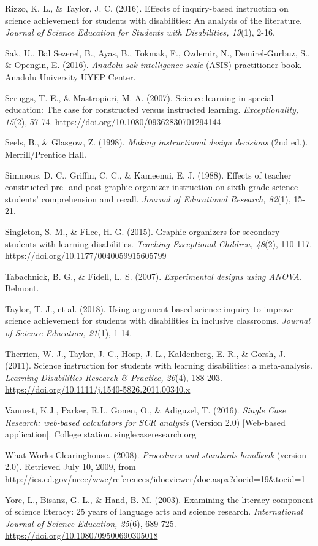 \documentclass[11.5pt]{sig-alternate} %
\begin{document}
Rizzo, K. L., \& Taylor, J. C. (2016). Effects of inquiry-based instruction on science achievement for students with disabilities: An analysis of the literature. \textit{Journal of Science Education for Students with Disabilities, 19}(1), 2-16.

Sak, U., Bal Sezerel, B., Ayas, B., Tokmak, F., Ozdemir, N., Demirel-Gurbuz, S., \& Opengin, E. (2016). \textit{Anadolu-sak intelligence scale} (ASIS) practitioner book. Anadolu University UYEP Center. 

Scruggs, T. E., \& Mastropieri, M. A. (2007). Science learning in special education: The case for constructed versus instructed learning. \textit{Exceptionality, 15}(2), 57-74. \url{https://doi.org/10.1080/09362830701294144}

Seels, B., \& Glasgow, Z. (1998). \textit{Making instructional design decisions} (2nd ed.). Merrill/Prentice Hall. 

Simmons, D. C., Griffin, C. C., \& Kameenui, E. J. (1988). Effects of teacher constructed pre- and post-graphic organizer instruction on sixth-grade science students' comprehension and recall. \textit{Journal of Educational Research, 82}(1), 15-21.

Singleton, S. M., \& Filce, H. G. (2015). Graphic organizers for secondary students with learning disabilities. \textit{Teaching Exceptional Children, 48}(2), 110-117. \url{https://doi.org/10.1177/0040059915605799}

Tabachnick, B. G., \& Fidell, L. S. (2007). \textit{Experimental designs using ANOVA}. Belmont.

Taylor, T. J., et al. (2018). Using argument-based science inquiry to improve science achievement for students with disabilities in inclusive classrooms. \textit{Journal of Science Education, 21}(1), 1-14.

Therrien, W. J., Taylor, J. C., Hosp, J. L., Kaldenberg, E. R., \& Gorsh, J. (2011). Science instruction for students with learning disabilities: a meta-analysis. \textit{Learning Disabilities Research \& Practice, 26}(4), 188-203. \url{https://doi.org/10.1111/j.1540-5826.2011.00340.x}

Vannest, K.J., Parker, R.I., Gonen, O., \& Adiguzel, T. (2016). \textit{Single Case Research: web-based calculators for SCR analysis} (Version 2.0) [Web-based application]. College station. singlecaseresearch.org

What Works Clearinghouse. (2008). \textit{Procedures and standards handbook} (version 2.0). Retrieved July 10, 2009, from \url{http://ies.ed.gov/ncee/wwc/references/idocviewer/doc.aspx?docid=19&tocid=1} 

Yore, L., Bisanz, G. L., \& Hand, B. M. (2003). Examining the literacy component of science literacy: 25 years of language arts and science research. \textit{International Journal of Science Education, 25}(6), 689-725. \url{https://doi.org/10.1080/09500690305018}
\end{document}
